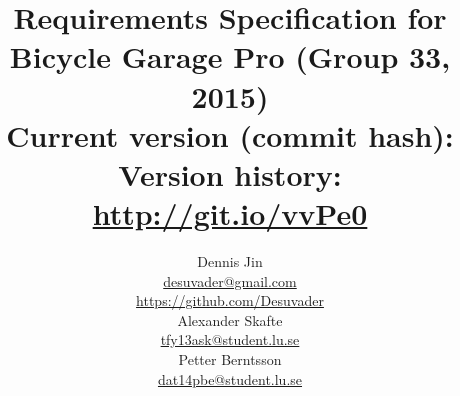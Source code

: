 \title{
	Requirements Specification for Bicycle Garage Pro (Group 33, 2015)\\
	\vspace{0.2in}
	\normalsize Current version (commit hash): \gitAbbrevHash\\
	\normalsize Version history: \url{http://git.io/vvPe0}
}
\author{
	Dennis Jin\\
	\url{desuvader@gmail.com}\\
	\url{https://github.com/Desuvader}\\
	Alexander Skafte\\
	\url{tfy13ask@student.lu.se}\\
	Petter Berntsson\\
	\url{dat14pbe@student.lu.se}
}
\date{}
